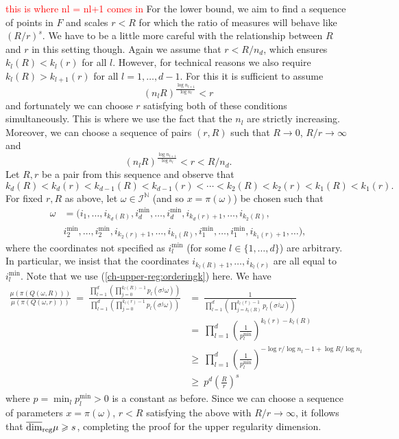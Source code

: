 \textcolor{red}{this is where nl = nl+1 comes in}
For the lower bound, we aim to find a sequence of points in $F$ and scales $r<R$ for which the ratio of measures will behave like $(R/r)^s$. We have to be a little more careful with the relationship between $R$ and $r$ in this setting though. Again we assume that $r < R/ n_d$, which ensures $k_l(R) < k_l(r)$ for all $l$.  However, for technical reasons we also require $k_l(R) > k_{l+1}(r)$ for all $l = 1, \dots, d-1$.  For this it is sufficient to assume
\[
(n_lR)^{\frac{\log n_{l+1}}{\log n_l}} < r
\]
and fortunately we can choose $r$ satisfying both of these conditions simultaneously.  This is where we use the fact that the $n_l$ are strictly increasing.  Moreover, we can choose a sequence of pairs $(r,R)$ such that $R \to 0$, $R/r \to \infty$ and
\[
(n_lR)^{\frac{\log n_{l+1}}{\log n_l}} < r < R/ n_d.
\]
Let $R,r$ be a pair from this sequence and observe that
\begin{equation} \label{ch-upper-reg:orderingk}
k_d(R)< k_d(r)<k_{d-1}(R)< k_{d-1}(r)< \cdots <k_2(R)<k_2(r)<k_1(R)<k_1(r).
\end{equation}
For fixed $r,R$ as above, let $\omega \in \mathcal{I}^{\mathbb{N}}$ (and so $x = \pi(\omega)$) be chosen such that
\begin{align*} 
\omega&= (i_1,\ldots, i_{k_d(R)}, i_d^{\text{min}},\ldots, i_d^{\text{min}}, i_{k_d(r)+1},\ldots, i_{k_2(R)},\\
&i_2^{\text{min}},\ldots , i_2^{\text{min}}, i_{k_2(r)+1},\ldots, i_{k_1(R)}, i_1^{\text{min}}, \ldots, i_1^{\text{min}}, i_{k_1(r)+1},\ldots),
\end{align*}
where the coordinates not specified as $i_l^{\text{min}}$ (for some $l \in \{1, \dots, d\}$) are arbitrary.  In particular, we insist that the coordinates $i_{k_l(R)+1}, \dots, i_{k_l(r)}$ are all equal to $i_l^{\min}$. Note that we use (\ref{ch-upper-reg:orderingk}) here. We have
\begin{align*}
\frac{\mu(\pi(Q(\omega,R)))}{\mu(\pi(Q(\omega,r)))}  \ = \ \frac{\prod_{l=1}^d\left(\prod_{j=0}^{k_l(R)-1}p_l(\sigma^j \omega) \right)}{\prod_{l=1}^d\left(\prod_{j=0}^{k_l(r)-1}p_l(\sigma^j \omega) \right)} & =\ \frac{1}{\prod_{l=1}^d\left(\prod_{j=k_l(R)}^{k_l(r)-1}p_l(\sigma^j \omega) \right)} \\
& = \ \prod_{l=1}^d\left( \frac{1}{p_l^{\text{min}}}\right)^{k_l(r)-k_l(R)}  \\
& \ge\  \prod_{l=1}^d \left( \frac{1}{p_l^{\text{min}}}\right)^{-\log r/\log n_l -1+ \log R/\log n_l }  \\
& \ge \ p^{d} \left( \frac{R}{r} \right)^{s}
\end{align*}
where $p = \min_l p_l^{\text{min}}>0$ is a constant as before.  Since we can choose a sequence of parameters $x = \pi(\omega)$, $r<R$ satisfying the above with $R/r \to \infty$, it follows that $\overline{\dim}_{\textup{reg}} \mu \geqslant s$, completing the proof for the upper regularity dimension.






